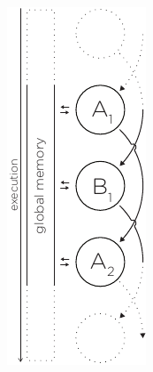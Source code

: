   \begin{figure}
  \centering
    \begin{minipage}[t]{0.23\textwidth}
      \centering
      \includegraphics[page=3, height=2\linewidth]{../resources/invariance.pdf}

\end{minipage}
\end{figure}
